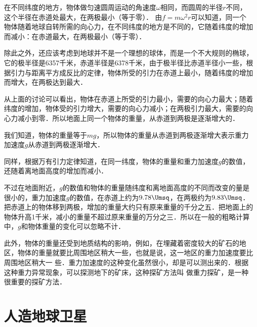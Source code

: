 在不同纬度的地方，物体做匀速圆周运动的角速度$\omega$相同，而圆周的半径$r$不同，这个半径在赤道处最大，在两极最小（等于零）．
由$f=m\omega^2 r$可以知道，同一个物体随着地球自转所需的向心力，在不同纬度的地方是不同的，它随着纬度的增加而减小：在赤道最大，在两极最小（等于零）．

除此之外，还应该考虑到地球并不是一个理想的球体，而是一个不大规则的椭球，它的极半径是6357千米，赤道半径是6378千米，由于极半径比赤道半径小一些，根据引力与距离平方成反比的定律，物体所受的引力在赤道上最小，随着纬度的增加而增大，在两极达到最大．

从上面的讨论可以看出，物体在赤道上所受的引力最小，需要的向心力最大；随着纬度的增加，物体受的引力增大，需要的向心力减小；在两极引力最大，需要的向心力减小到零．所以地面上同一个物体的重量，从赤道到两极是逐渐增大的．

我们知道，物体的重量等于$mg$，所以物体的重量从赤道到两极逐渐增大表示重力加速度$g$从赤道到两极逐渐增大．

同样，根据万有引力定律知道，在同一纬度，物体的重量和重力加速度$g$的数值，还随着离地面高度的增加而减小．

不过在地面附近，$g$的数值和物体的重量随纬度和离地面高度的不同而改变的量是很小的，重力加速度$g$的数值，在赤道上约为$9.78 \Umsq$，在两极约为$9.83 \Umsq$．把赤道上的物体移到两极，增加的重量大约只有原来重量的千分之五．把地面上的物体升高1千米，减小的重量不超过原来重量的万分之三．所以在一般的粗略计算中，$g$和物体重量的变化可以忽略不计．

此外，物体的重量还受到地质结构的影响，例如，在埋藏着密度较大的矿石的地区，物体的重量就要比周围地区稍大一些，也就是说，这一地区的重力加速度要比周围地区稍大一
些．重力加速度的这种变化虽然很小，却是可以测出来的．根据这种重力异常现象，可以探测地下的矿床，这种探矿方法叫
做重力探矿，是一种很重要的探矿方法．

\section{人造地球卫星}

